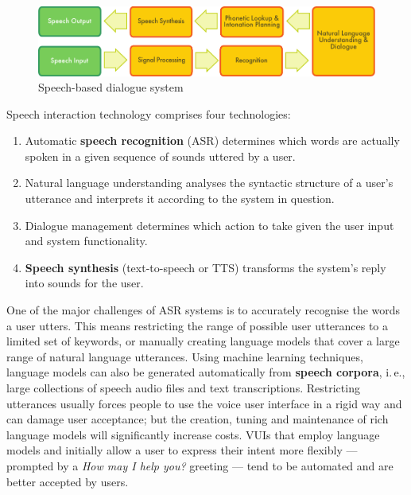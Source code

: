 \documentclass[]{../metanetpaper}
\begin{document}
\begin{multicols}{2}
\begin{figure}[htb]
  \center
  \includegraphics[width=\textwidth]{../_media/english/simple_speech-based_dialogue_architecture}
  \caption{Speech-based dialogue system}
  \label{fig:dialoguearch_en}
\end{figure}

Speech interaction technology comprises four technologies: 

\begin{enumerate}
\item Automatic \textbf{speech recognition} (ASR) determines which words are actually spoken in a given sequence of sounds uttered by a user.  
\item Natural language understanding analyses the syntactic structure of a user’s utterance and interprets it according to the system in question.
\item Dialogue management determines which action to take given the user input and system functionality.   
\item \textbf{Speech synthesis} (text-to-speech or TTS) transforms the system’s reply into sounds for the user.
\end{enumerate}

One of the major challenges of ASR systems is to accurately recognise the words a user utters. This means restricting the range of possible user utterances to a limited set of keywords, or manually creating language models that cover a large range of natural language utterances. Using machine learning techniques, language models can also be generated automatically from \textbf{speech corpora}, i.\,e., large collections of speech audio files and text transcriptions. Restricting utterances usually forces people to use the voice user interface in a rigid way and can damage user acceptance; but the creation, tuning and maintenance of rich language models will significantly increase costs. VUIs that employ language models and initially allow a user to express their intent more flexibly — prompted by a \textit{How may I help you?} greeting — tend to be automated and are better accepted by users.


\end{multicols}
\end{document}
